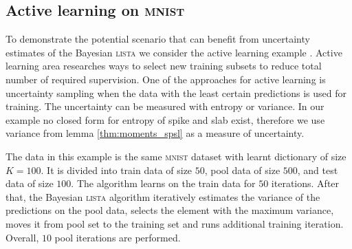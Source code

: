 \documentclass[letterpaper]{article}
\begin{document}
\subsection{Active learning on \textsc{mnist}}
To demonstrate the potential scenario that can benefit from uncertainty estimates of the Bayesian \textsc{lista} we consider the active learning example \citep{settles.tr09}. Active learning area researches ways to select new training subsets to reduce total number of required supervision. One of the approaches for active learning is uncertainty sampling when the data with the least certain predictions is used for training. The uncertainty can be measured with entropy or variance. In our example no closed form for entropy of spike and slab exist, therefore we use variance from lemma \ref{thm:moments_spsl} as a measure of uncertainty.

The data in this example is the same \textsc{mnist} dataset with learnt dictionary of size $K=100$. It is divided into train data of size $50$, pool data of size $500$,  and test data of size $100$. The algorithm learns on the train data for $50$ iterations. After that, the Bayesian \textsc{lista} algorithm iteratively estimates the variance of the predictions on the pool data, selects the element with the maximum variance, moves it from pool set to the training set and runs additional training iteration. Overall, $10$ pool iterations are performed.
\end{document}
